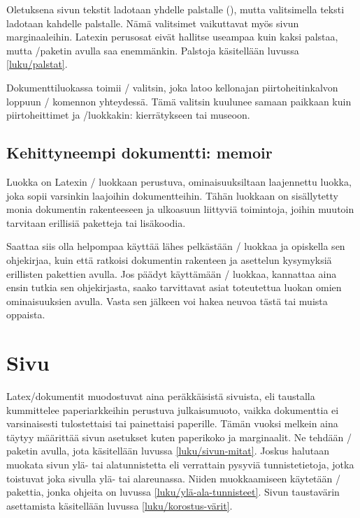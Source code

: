 Oletuksena sivun tekstit ladotaan yhdelle palstalle
(), mutta valitsimella  teksti
ladotaan kahdelle palstalle. Nämä valitsimet vaikuttavat myös sivun
marginaaleihin. Latexin perusosat eivät hallitse useampaa kuin kaksi
palstaa, mutta \-/paketin avulla saa enemmänkin.
Palstoja käsitellään luvussa \ref{luku/palstat}.

Dokumenttiluokassa  toimii \-/ valitsin,
joka latoo kellonajan piirtoheitinkalvon loppuun \-/
komennon yhteydessä. Tämä valitsin kuulunee samaan paikkaan kuin
piirtoheittimet ja \-/luokkakin: kierrätykseen tai
museoon.

\subsection{Kehittyneempi dokumentti: memoir}

Luokka  on Latexin \-/ luokkaan
perustuva, ominaisuuksiltaan laajennettu luokka, joka sopii varsinkin
laajoihin dokumentteihin. Tähän luokkaan on sisällytetty monia
dokumentin rakenteeseen ja ulkoasuun liittyviä toimintoja, joihin
muutoin tarvitaan erillisiä paketteja tai lisäkoodia.

Saattaa siis olla helpompaa käyttää lähes pelkästään \-/
luokkaa ja opiskella sen ohjekirjaa, kuin että ratkoisi dokumentin
rakenteen ja asettelun kysymyksiä erillisten pakettien avulla. Jos
päädyt käyttämään \-/ luokkaa, kannattaa aina ensin
tutkia sen ohjekirjasta, saako tarvittavat asiat toteutettua luokan
omien ominaisuuksien avulla. Vasta sen jälkeen voi hakea neuvoa tästä
tai muista oppaista.

\section{Sivu}
\label{luku/sivuasetukset}

Latex\-/dokumentit muodostuvat aina peräkkäisistä sivuista, eli
taustalla kummittelee paperiarkkeihin perustuva julkaisumuoto, vaikka
dokumenttia ei varsinaisesti tulostettaisi tai painettaisi paperille.
Tämän vuoksi melkein aina täytyy määrittää sivun asetukset kuten
paperikoko ja marginaalit. Ne tehdään \-/ paketin
avulla, jota käsitellään luvussa \ref{luku/sivun-mitat}. Joskus halutaan
muokata sivun ylä- tai alatunnistetta eli verrattain pysyviä
tunnistetietoja, jotka toistuvat joka sivulla ylä- tai alareunassa.
Niiden muokkaamiseen käytetään \-/ pakettia, jonka
ohjeita on luvussa \ref{luku/ylä-ala-tunnisteet}. Sivun taustavärin
asettamista käsitellään luvussa \ref{luku/korostus-värit}.

